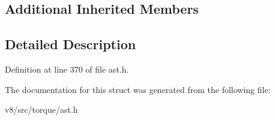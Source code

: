 \subsection*{Additional Inherited Members}


\subsection{Detailed Description}


Definition at line 370 of file ast.\+h.



The documentation for this struct was generated from the following file\+:\begin{DoxyCompactItemize}
\item 
v8/src/torque/ast.\+h\end{DoxyCompactItemize}
